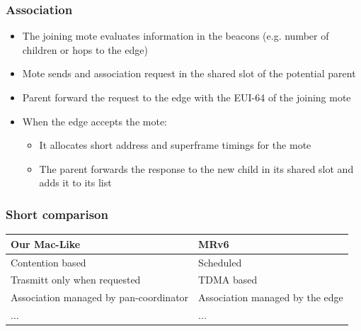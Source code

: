 \begin{frame}[fragile]
  \frametitle{Association}
  \begin{itemize}
    \item The joining mote evaluates information in the beacons (e.g. number of children or hops to the edge)
    \item Mote sends and association request in the shared slot of the potential parent
    \item Parent forward the request to the edge with the EUI-64 of the joining mote
    \item When the edge accepts the mote:
    \begin{itemize}
      \item It allocates short address and superframe timings for the mote
      \item The parent forwards the response to the new child in its shared slot and adds it to its list
    \end{itemize}
  \end{itemize}
\end{frame}

\begin{frame}[fragile]
 \frametitle{Short comparison}
 \begin{table}[h]
    \begin{tabular}{@{}p{5cm}|p{5cm}@{}}
      \toprule
      Our Mac-Like &  MRv6 \\ \midrule
      Contention based &  Scheduled\\
      Trasmitt only when  \mbox{requested} &  TDMA based\\
      Association managed by pan-coordinator & Association managed by the edge  \\ 
      ... & ... \\ \bottomrule
    \end{tabular}
  \end{table}
\end{frame}

